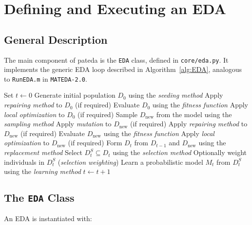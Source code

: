 \documentclass[a4paper,11pt]{article}
\begin{document}
\section{Defining and Executing an EDA}
\label{sec:eda}

\subsection{General Description}

The main component of pateda is the \texttt{EDA} class, defined in \texttt{core/eda.py}.  It implements the generic EDA loop described in Algorithm~\ref{alg:EDA}, analogous to \texttt{RunEDA.m} in \texttt{MATEDA-2.0}.

\begin{algorithm}
\caption{Estimation of Distribution Algorithm}
\label{alg:EDA}
\begin{algorithmic}[1]
\State Set $t \leftarrow 0$
\Repeat
    \State Generate initial population $D_0$ using the \emph{seeding method}
    \State Apply \emph{repairing method} to $D_0$ (if required)
    \State Evaluate $D_0$ using the \emph{fitness function}
    \State Apply \emph{local optimization} to $D_0$ (if required)
  \Else
    \State Sample $D_\text{new}$ from the model using the \emph{sampling method}
    \State Apply \emph{mutation} to $D_\text{new}$ (if required)
    \State Apply \emph{repairing method} to $D_\text{new}$ (if required)
    \State Evaluate $D_\text{new}$ using the \emph{fitness function}
    \State Apply \emph{local optimization} to $D_\text{new}$ (if required)
    \State Form $D_t$ from $D_{t-1}$ and $D_\text{new}$ using the \emph{replacement method}
  \EndIf
  \State Select $D_t^S \subseteq D_t$ using the \emph{selection method}
  \State Optionally weight individuals in $D_t^S$ (\emph{selection weighting})
  \State Learn a probabilistic model $M_t$ from $D_t^S$ using the \emph{learning method}
  \State $t \leftarrow t + 1$
\end{algorithmic}
\end{algorithm}

\subsection{The \texttt{EDA} Class}

An EDA is instantiated with:
\end{document}
